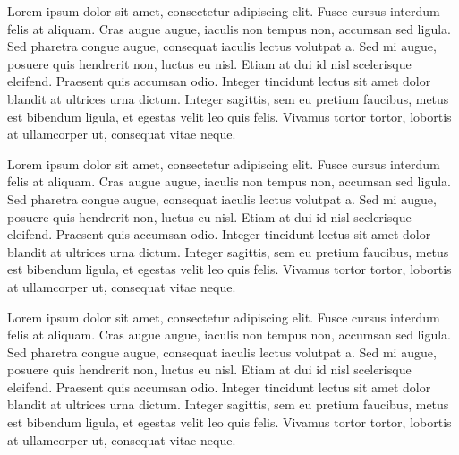 \documentclass[a4paper,11pt]{report}
\begin{document}
Lorem ipsum dolor sit amet, consectetur adipiscing elit. Fusce cursus interdum felis at aliquam. Cras augue augue, iaculis non tempus non, accumsan sed ligula. Sed pharetra congue augue, consequat iaculis lectus volutpat a. Sed mi augue, posuere quis hendrerit non, luctus eu nisl. Etiam at dui id nisl scelerisque eleifend. Praesent quis accumsan odio. Integer tincidunt lectus sit amet dolor blandit at ultrices urna dictum. Integer sagittis, sem eu pretium faucibus, metus est bibendum ligula, et egestas velit leo quis felis. Vivamus tortor tortor, lobortis at ullamcorper ut, consequat vitae neque.

Lorem ipsum dolor sit amet, consectetur adipiscing elit. Fusce cursus interdum felis at aliquam. Cras augue augue, iaculis non tempus non, accumsan sed ligula. Sed pharetra congue augue, consequat iaculis lectus volutpat a. Sed mi augue, posuere quis hendrerit non, luctus eu nisl. Etiam at dui id nisl scelerisque eleifend. Praesent quis accumsan odio. Integer tincidunt lectus sit amet dolor blandit at ultrices urna dictum. Integer sagittis, sem eu pretium faucibus, metus est bibendum ligula, et egestas velit leo quis felis. Vivamus tortor tortor, lobortis at ullamcorper ut, consequat vitae neque. 

Lorem ipsum dolor sit amet, consectetur adipiscing elit. Fusce cursus interdum felis at aliquam. Cras augue augue, iaculis non tempus non, accumsan sed ligula. Sed pharetra congue augue, consequat iaculis lectus volutpat a. Sed mi augue, posuere quis hendrerit non, luctus eu nisl. Etiam at dui id nisl scelerisque eleifend. Praesent quis accumsan odio. Integer tincidunt lectus sit amet dolor blandit at ultrices urna dictum. Integer sagittis, sem eu pretium faucibus, metus est bibendum ligula, et egestas velit leo quis felis. Vivamus tortor tortor, lobortis at ullamcorper ut, consequat vitae neque. 
\end{document}
